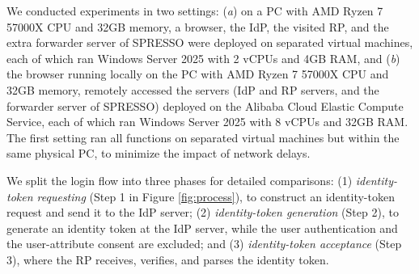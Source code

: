 We conducted experiments in two settings: (\emph{a}) on a PC with AMD Ryzen 7 57000X CPU and 32GB memory, a browser, the IdP, the visited RP, and the extra forwarder server of SPRESSO were deployed on separated virtual machines, each of which ran Windows Server 2025 with 2 vCPUs and 4GB RAM, and (\emph{b}) the browser running locally on the PC with AMD Ryzen 7 57000X CPU and 32GB memory, remotely accessed the servers (IdP and RP servers, and the forwarder server of SPRESSO) deployed on the Alibaba Cloud Elastic Compute Service, each of which ran Windows Server 2025 with 8 vCPUs and 32GB RAM. 
The first setting ran all functions on separated virtual machines but within the same physical PC,
    to minimize the impact of network delays.




 We split the login flow into three phases for detailed comparisons: (1)
{\em identity-token requesting} (Step 1 in Figure \ref{fig:process}), to construct an identity-token request and send it to the IdP server; (2) {\em identity-token generation} (Step 2), to generate an identity token at the IdP server, while the user authentication and the user-attribute consent are excluded; and (3) {\em identity-token acceptance} (Step 3), where the RP receives, verifies, and parses the identity token.



